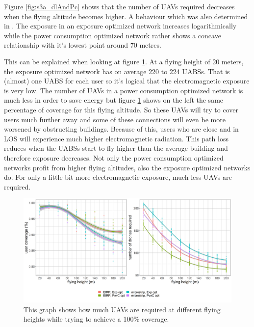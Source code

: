 Figure \ref{fig:s3a_dlAndPc} shows that the number of \gls{UAV}s required decreases when the flying altitude becomes higher.
A behaviour which was also determined in \cite{J2}.
The exposure in an exposure optimized network increases logarithmically while the power consumption optimized network rather 
shows a concave relationship with it's lowest point around 70 metres.

This can be explained when looking at figure \ref{fig:s3a_numDronesAndCov}.
At a flying height of 20 meters, the exposure optimized network has on average 220 to 224 \gls{UABS}s. That is (almost) one \gls{UABS} for each user
so it's logical that the electromagnetic exposure is very low.
The number of \gls{UAV}s in a power consumption optimized network is much less in order 
to save energy but figure \ref{fig:s3a_numDronesAndCov} shows on the left the same percentage of coverage for this flying altitude.
So these \gls{UAV}s will try to cover users much further away and some of these connections will even be more worsened by obstructing buildings.
Because of this, users who are close and in \gls{LOS} will experience much higher electromagnetic radiation.
This path loss reduces when the \gls{UABS}s start to fly higher than the average building and therefore exposure decreases.
Not only the power consumption optimized networks profit from higher flying altitudes, also the exposure optimized networks do. For only a little bit 
more electromagnetic exposure, much less \gls{UAV}s are required.

\begin{figure}[]
  \includegraphics[width=\textwidth]{../results/s3/fhvsnumdronesAndCov.png}
  \caption{This graph shows how much \gls{UAV}s are required at different flying heights while trying to achieve a 100\% coverage.}
  \label{fig:s3a_numDronesAndCov}
\end{figure}

